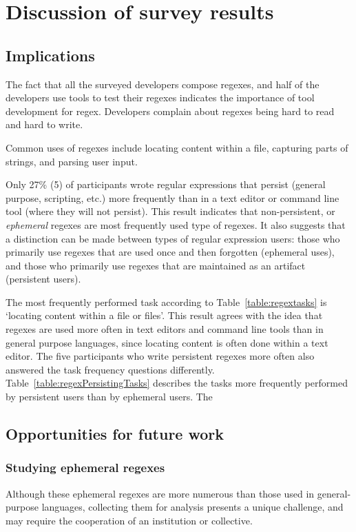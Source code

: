 \section{Discussion of survey results}
\subsection{Implications}


The fact that all the surveyed developers compose regexes, and half of the developers use tools to test their regexes indicates the importance of tool development for regex.  Developers complain about regexes being hard to read and hard to write.

Common uses of regexes include locating content within a file, capturing parts of strings, and parsing user input.



Only 27\% (5)
of participants wrote regular expressions that persist (general purpose, scripting, etc.) more frequently than in a text editor or command line tool (where they will not persist).  This result indicates that non-persistent, or \emph{ephemeral} regexes are most frequently used type of regexes.  It also suggests that a distinction can be made between types of regular expression users: those who primarily use regexes that are used once and then forgotten (ephemeral uses), and those who primarily use regexes that are maintained as an artifact (persistent users).

The most frequently performed task according to Table~\ref{table:regextasks} is `locating content within a file or files'.  This result agrees with the idea that regexes are used more often in text editors and command line tools than in general purpose languages, since locating content is often done within a text editor.  The five participants who write persistent regexes more often also answered the task frequency questions differently.  Table~\ref{table:regexPersistingTasks} describes the tasks more frequently performed by persistent users than by ephemeral users.  The



\subsection{Opportunities for future work}

\subsubsection{Studying ephemeral regexes}
Although these ephemeral regexes are more numerous than those used in general-purpose languages, collecting them for analysis presents a unique challenge, and may require the cooperation of an institution or collective.

